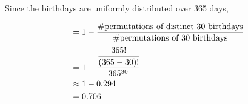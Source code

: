 \documentclass[a4paper, 12pt]{article}
\begin{document}
Since the birthdays are uniformly distributed over 365 days,

\begin{fleqn}[\parindent]
\begin{equation}
\begin{split}
&= 1 - \frac{\text{\#permutations of distinct 30 birthdays}}{\text{\#permutations of 30 birthdays}} \\
&= 1 - \frac{\cfrac{365!}{(365-30)!}}{365^{30}} \\
&\approx 1 - 0.294 \\
&= 0.706
\end{split}
\end{equation}
\end{fleqn}
\end{document}
